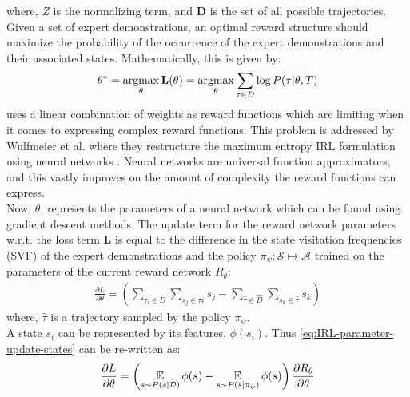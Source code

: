 where, $Z$ is the normalizing term, and $\mathbf{D}$ is the set of all possible trajectories.\\
Given a set of expert demonstrations, an optimal reward structure should maximize the probability of the occurrence of the expert demonstrations and their associated states. Mathematically, this is given by: 
\begin{align}
\label{eq:loglikelihood-IRL}
\theta^{*} = \operatorname*{argmax}_{\theta} \mathbf{L}(\theta) = \operatorname*{argmax}_{\theta} \sum_{\tau \in D} \log{P(\tau| \theta, T)}
\end{align}
\cite{ziebart_maxent_2008} uses a linear combination of weights as reward functions which are limiting when it comes to expressing complex reward functions. This problem is addressed by Wulfmeier et al. where they restructure the maximum entropy IRL formulation using neural networks \cite{wulfmeier2015maximum}. Neural networks are universal function approximators, and this vastly improves on the amount of complexity the reward functions can express.\\
Now, $\theta$, represents the parameters of a neural network which can be found using gradient descent methods. The  update term for the reward network parameters w.r.t. the loss term $\mathbf{L}$ is equal to the difference in the state visitation frequencies (SVF) of the expert demonstrations and the policy $\pi_{\psi} : \mathcal{S} \mapsto \mathcal{A} $ trained on the parameters of the current reward network $R_{\theta}$:
\begin{align}
	\label{eq:IRL-parameter-update-states}
	\frac{\partial L}{\partial \theta} = \left(\sum_{\tau_{i} \in D}\sum_{s_{j} \in \tau{i}}s_{j} - \sum_{\hat{\tau} \in \hat{D}}\sum_{s_{k} \in \hat{\tau}}s_{k}\right)
\end{align}
where, $\hat{\tau}$ is a trajectory sampled by the policy $\pi_{\psi}$.\\
A state $s_{i}$ can be represented by its features, $\phi(s_{i})$. Thus \autoref{eq:IRL-parameter-update-states} can be re-written as:
\begin{align}
	\label{eq:IRL-parameter-update-features}
	\frac{\partial L}{\partial \theta} = \left(\operatorname*{\mathbb{E}}_{s \sim P(s|\mathcal{D})} \phi(s) - \operatorname*{\mathbb{E}}_{s \sim P(s|\pi_\psi)} \phi(s)\right) \frac{\partial R_\theta}{\partial \theta} 
\end{align}
